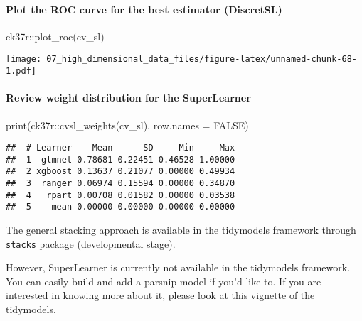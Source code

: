 \documentclass[
]{book}
\newenvironment{Shaded}{\begin{snugshade}}{\end{snugshade}}
\newcommand{\AttributeTok}[1]{\textcolor[rgb]{0.77,0.63,0.00}{#1}}
\newcommand{\ConstantTok}[1]{\textcolor[rgb]{0.00,0.00,0.00}{#1}}
\newcommand{\FunctionTok}[1]{\textcolor[rgb]{0.00,0.00,0.00}{#1}}
\newcommand{\NormalTok}[1]{#1}
\newcommand{\SpecialCharTok}[1]{\textcolor[rgb]{0.00,0.00,0.00}{#1}}
\begin{document}
\hypertarget{plot-the-roc-curve-for-the-best-estimator-discretsl}{%
\paragraph{Plot the ROC curve for the best estimator (DiscretSL)}\label{plot-the-roc-curve-for-the-best-estimator-discretsl}}

\begin{Shaded}
\begin{Highlighting}[]
\NormalTok{ck37r}\SpecialCharTok{::}\FunctionTok{plot\_roc}\NormalTok{(cv\_sl)}
\end{Highlighting}
\end{Shaded}

\texttt{[image: 07\_high\_dimensional\_data\_files/figure-latex/unnamed-chunk-68-1.pdf]}

\hypertarget{review-weight-distribution-for-the-superlearner}{%
\paragraph{Review weight distribution for the SuperLearner}\label{review-weight-distribution-for-the-superlearner}}

\begin{Shaded}
\begin{Highlighting}[]
\FunctionTok{print}\NormalTok{(ck37r}\SpecialCharTok{::}\FunctionTok{cvsl\_weights}\NormalTok{(cv\_sl), }\AttributeTok{row.names =} \ConstantTok{FALSE}\NormalTok{)}
\end{Highlighting}
\end{Shaded}

\begin{verbatim}
##  # Learner    Mean      SD     Min     Max
##  1  glmnet 0.78681 0.22451 0.46528 1.00000
##  2 xgboost 0.13637 0.21077 0.00000 0.49934
##  3  ranger 0.06974 0.15594 0.00000 0.34870
##  4   rpart 0.00708 0.01582 0.00000 0.03538
##  5    mean 0.00000 0.00000 0.00000 0.00000
\end{verbatim}

The general stacking approach is available in the tidymodels framework through \href{https://github.com/tidymodels/stacks}{\texttt{stacks}} package (developmental stage).

However, SuperLearner is currently not available in the tidymodels framework. You can easily build and add a parsnip model if you'd like to. If you are interested in knowing more about it, please look at \href{https://www.tidymodels.org/learn/develop/models/}{this vignette} of the tidymodels.
\end{document}
